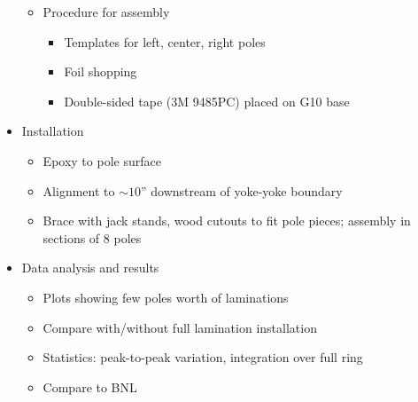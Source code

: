 \begin{itemize}
\begin{itemize}
\begin{itemize}
                  \end{itemize}   
            \item Procedure for assembly
                  \begin{itemize}
                     \item Templates for left, center, right poles 
		     \item Foil shopping
                     \item Double-sided tape (3M 9485PC) placed on G10 base
                  \end{itemize}
         \end{itemize} 
   \item Installation 
         \begin{itemize}
            \item Epoxy to pole surface 
            \item Alignment to $\sim 10$'' downstream of yoke-yoke boundary  
            \item Brace with jack stands, wood cutouts to fit pole pieces; assembly in sections of 8 poles   
         \end{itemize} 
   \item Data analysis and results   
         \begin{itemize}  
            \item Plots showing few poles worth of laminations 
            \item Compare with/without full lamination installation
            \item Statistics: peak-to-peak variation, integration over full ring 
            \item Compare to BNL   
         \end{itemize} 
\end{itemize} 

